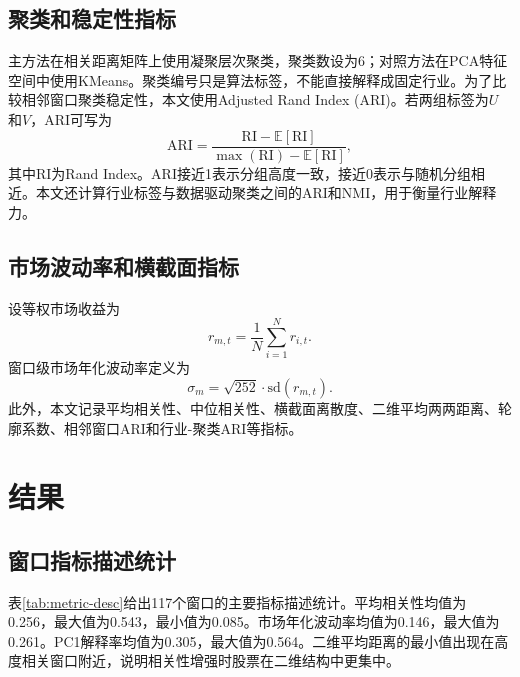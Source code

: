 \documentclass[UTF8,zihao=-4]{ctexart}
\begin{document}
\subsection{聚类和稳定性指标}
主方法在相关距离矩阵上使用凝聚层次聚类，聚类数设为6；对照方法在PCA特征空间中使用KMeans。聚类编号只是算法标签，不能直接解释成固定行业。为了比较相邻窗口聚类稳定性，本文使用Adjusted Rand Index (ARI)\cite{HubertArabie1985}。若两组标签为$U$和$V$，ARI可写为
\begin{equation}
\mathrm{ARI}=\frac{\mathrm{RI}-\mathbb{E}[\mathrm{RI}]}{\max(\mathrm{RI})-\mathbb{E}[\mathrm{RI}]},
\end{equation}
其中RI为Rand Index。ARI接近1表示分组高度一致，接近0表示与随机分组相近。本文还计算行业标签与数据驱动聚类之间的ARI和NMI，用于衡量行业解释力。

\subsection{市场波动率和横截面指标}
设等权市场收益为
\begin{equation}
r_{m,t}=\frac{1}{N}\sum_{i=1}^{N}r_{i,t}.
\end{equation}
窗口级市场年化波动率定义为
\begin{equation}
\sigma_m=\sqrt{252}\cdot \mathrm{sd}(r_{m,t}).
\end{equation}
此外，本文记录平均相关性、中位相关性、横截面离散度、二维平均两两距离、轮廓系数、相邻窗口ARI和行业-聚类ARI等指标。

\section{结果}
\subsection{窗口指标描述统计}
表\ref{tab:metric-desc}给出117个窗口的主要指标描述统计。平均相关性均值为0.256，最大值为0.543，最小值为0.085。市场年化波动率均值为0.146，最大值为0.261。PC1解释率均值为0.305，最大值为0.564。二维平均距离的最小值出现在高度相关窗口附近，说明相关性增强时股票在二维结构中更集中。
\end{document}
